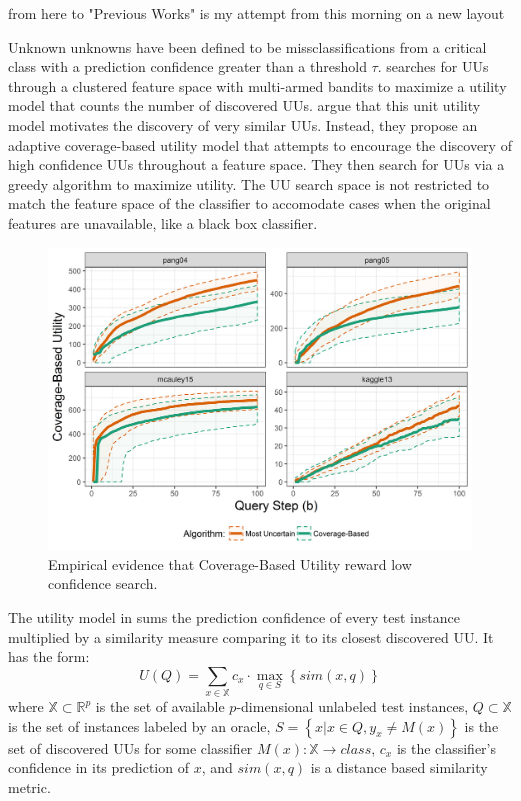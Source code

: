 \documentclass[letterpaper]{article} %
\newcommand{\wdb}[1]{{\color{blue} #1}} %
\begin{document}
\wdb{from here to "Previous Works" is my attempt from this morning on a new layout}





Unknown unknowns have been defined to be missclassifications from a critical class with a prediction confidence greater than a threshold $\tau$.  \citet{Lakkaraju2016} searches for UUs through a clustered feature space with multi-armed bandits to maximize a utility model that counts the number of discovered UUs.  \citet{Bansal2018} argue that this unit utility model motivates the discovery of very similar UUs. Instead, they propose an adaptive coverage-based utility model that attempts to encourage the discovery of high confidence UUs throughout a feature space. They then search for UUs via a greedy algorithm to maximize utility.  The UU search space is not restricted to match the feature space of the classifier to accomodate cases when the original features are unavailable, like a black box classifier.

\begin{figure}[h!]
  \centering
  \includegraphics[width=\textwidth]{../experimentsAndPlots/CoverageVsMostUncertainPlaceholder.png}
  \caption{Empirical evidence that Coverage-Based Utility reward low confidence search.}
  \label{fig:coverutil}
\end{figure}

The utility model in \citet{Bansal2018} sums the prediction confidence of every test instance multiplied by a similarity measure comparing it to its closest discovered UU.  It has the form: $$U(Q) = \sum_{x \in \mathbb{X}} c_x \cdot \max_{q \in S} \left\{sim\left(x,q \right) \right\}$$ where $\mathbb{X} \subset \mathbb{R}^p$ is the set of available $p$-dimensional unlabeled test instances, $Q \subset \mathbb{X}$ is the set of instances labeled by an oracle, $S = \left\{x|x \in Q, y_x \neq M(x)\right\}$ is the set of discovered UUs for some classifier $M(x):\mathbb{X} \rightarrow class$, $c_x$ is the classifier's confidence in its prediction of $x$, and $sim(x,q)$ is a distance based similarity metric. 
\end{document}
